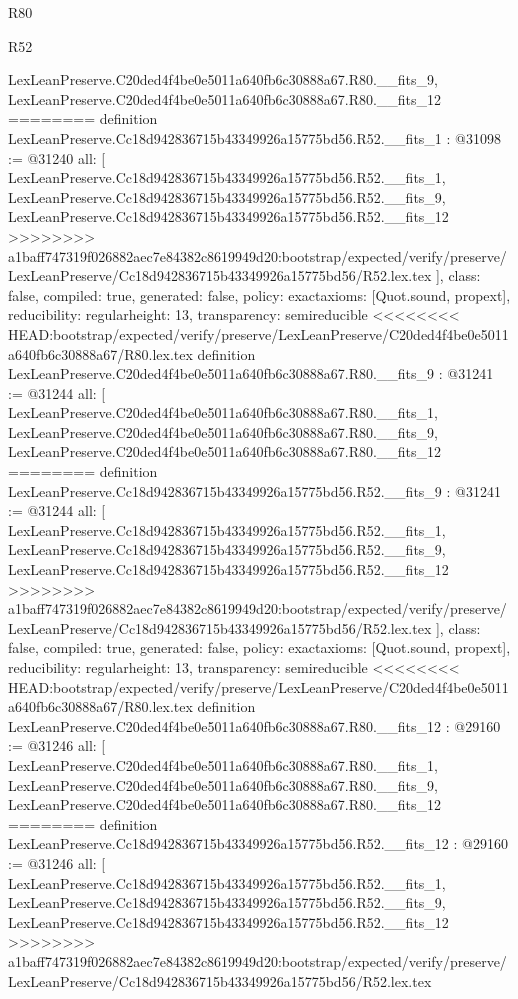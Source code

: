 \begin{lexlean}{R80}
\begin{lexlean}{R52}
\begin{coremodule}
{{{{{{{{{{{{{{{{{{{{{{{{{{{{{{{{{{{{{{{{{{{{{{{{{{{{{{{{{{{{{{{{{{{{{{{{{{{{{{{{{{{{{{{{{{{{{{{{{{{{{{{{{{{{{{{{{{{{{{{{{{{{{{{{{{{{{{{{{{{{{{{{{{{{{    LexLeanPreserve.C20ded4f4be0e5011a640fb6c30888a67.R80.__fits_9,
    LexLeanPreserve.C20ded4f4be0e5011a640fb6c30888a67.R80.__fits_12
========
definition LexLeanPreserve.Cc18d942836715b43349926a15775bd56.R52.__fits_1 : @31098 := @31240 {
  all: [
    LexLeanPreserve.Cc18d942836715b43349926a15775bd56.R52.__fits_1,
    LexLeanPreserve.Cc18d942836715b43349926a15775bd56.R52.__fits_9,
    LexLeanPreserve.Cc18d942836715b43349926a15775bd56.R52.__fits_12
>>>>>>>> a1baff747319f026882aec7e84382c8619949d20:bootstrap/expected/verify/preserve/LexLeanPreserve/Cc18d942836715b43349926a15775bd56/R52.lex.tex
  ],
  class: false,
  compiled: true,
  generated: false,
  policy: exact{axioms: [Quot.sound, propext]},
  reducibility: regular{height: 13},
  transparency: semireducible
}
<<<<<<<< HEAD:bootstrap/expected/verify/preserve/LexLeanPreserve/C20ded4f4be0e5011a640fb6c30888a67/R80.lex.tex
definition LexLeanPreserve.C20ded4f4be0e5011a640fb6c30888a67.R80.__fits_9 : @31241 := @31244 {
  all: [
    LexLeanPreserve.C20ded4f4be0e5011a640fb6c30888a67.R80.__fits_1,
    LexLeanPreserve.C20ded4f4be0e5011a640fb6c30888a67.R80.__fits_9,
    LexLeanPreserve.C20ded4f4be0e5011a640fb6c30888a67.R80.__fits_12
========
definition LexLeanPreserve.Cc18d942836715b43349926a15775bd56.R52.__fits_9 : @31241 := @31244 {
  all: [
    LexLeanPreserve.Cc18d942836715b43349926a15775bd56.R52.__fits_1,
    LexLeanPreserve.Cc18d942836715b43349926a15775bd56.R52.__fits_9,
    LexLeanPreserve.Cc18d942836715b43349926a15775bd56.R52.__fits_12
>>>>>>>> a1baff747319f026882aec7e84382c8619949d20:bootstrap/expected/verify/preserve/LexLeanPreserve/Cc18d942836715b43349926a15775bd56/R52.lex.tex
  ],
  class: false,
  compiled: true,
  generated: false,
  policy: exact{axioms: [Quot.sound, propext]},
  reducibility: regular{height: 13},
  transparency: semireducible
}
<<<<<<<< HEAD:bootstrap/expected/verify/preserve/LexLeanPreserve/C20ded4f4be0e5011a640fb6c30888a67/R80.lex.tex
definition LexLeanPreserve.C20ded4f4be0e5011a640fb6c30888a67.R80.__fits_12 : @29160 := @31246 {
  all: [
    LexLeanPreserve.C20ded4f4be0e5011a640fb6c30888a67.R80.__fits_1,
    LexLeanPreserve.C20ded4f4be0e5011a640fb6c30888a67.R80.__fits_9,
    LexLeanPreserve.C20ded4f4be0e5011a640fb6c30888a67.R80.__fits_12
========
definition LexLeanPreserve.Cc18d942836715b43349926a15775bd56.R52.__fits_12 : @29160 := @31246 {
  all: [
    LexLeanPreserve.Cc18d942836715b43349926a15775bd56.R52.__fits_1,
    LexLeanPreserve.Cc18d942836715b43349926a15775bd56.R52.__fits_9,
    LexLeanPreserve.Cc18d942836715b43349926a15775bd56.R52.__fits_12
>>>>>>>> a1baff747319f026882aec7e84382c8619949d20:bootstrap/expected/verify/preserve/LexLeanPreserve/Cc18d942836715b43349926a15775bd56/R52.lex.tex
}}}}}}}}}}}}}}}}}}}}}}}}}}}}}}}}}}}}}}}}}}}}}}}}}}}}}}}}}}}}}}}}}}}}}}}}}}}}}}}}}}}}}}}}}}}}}}}}}}}}}}}}}}}}}}}}}}}}}}}}}}}}}}}}}}}}}}}}}}}}}}}}}}}}}}}}
\end{coremodule}
\end{lexlean}
\end{lexlean}
